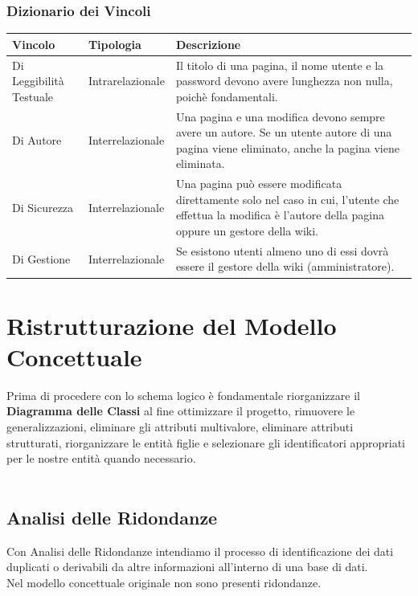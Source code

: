 \documentclass{article}
\begin{document}
	{\subsubsection {Dizionario dei Vincoli}}
	\begin{table}[H]
		\centering
		\small %
		\setlength{\tabcolsep}{6pt} %
		\renewcommand{\arraystretch}{1.2} %
		
		
		\begin{tabularx}{\textwidth}{|l|l|X|}
			\hline
			\textbf{Vincolo} &\textbf{Tipologia}  & \textbf{Descrizione} \\
			\hline
			Di Leggibilità Testuale & Intrarelazionale & Il titolo di una pagina, il nome utente e la password  devono avere lunghezza non nulla, poichè fondamentali.
			\\
			\hline
			Di Autore & Interrelazionale & Una pagina e una modifica devono sempre avere un autore. Se un utente autore di una pagina viene eliminato, anche la pagina viene eliminata.
			\\
			\hline	
			Di Sicurezza & Interrelazionale  & Una pagina può essere modificata direttamente solo nel caso in cui, l'utente che effettua la modifica è l'autore della pagina oppure un gestore della wiki.
			\\
			\hline	
			Di Gestione & Interrelazionale  & Se esistono utenti almeno uno di essi dovr\`a essere il gestore della wiki (amministratore).
			\\
			\hline
			
		\end{tabularx}
		
	\end{table}
	
	\newpage

	\section{Ristrutturazione del Modello Concettuale}
	Prima di procedere con lo schema logico è fondamentale riorganizzare il \textbf{Diagramma delle Classi} al fine ottimizzare il progetto, rimuovere le generalizzazioni, eliminare gli attributi multivalore, eliminare attributi strutturati, riorganizzare le entità figlie e selezionare gli identificatori appropriati per le nostre entità quando necessario. 
	\\\\

	\subsection{Analisi delle Ridondanze}
	Con Analisi delle Ridondanze intendiamo il processo di identificazione dei dati duplicati o derivabili da altre informazioni all'interno di una base di dati.
	\\
	Nel modello concettuale originale non sono presenti ridondanze. 
	\\\\
	
\end{document}
